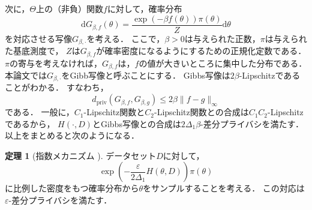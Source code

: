 \documentclass{jarticle}
\newcommand{\dd}{\mathrm{d}}
\theoremstyle{definition}
\newtheorem{thm}{定理}
\begin{document}
次に，$\Theta$上の（非負）関数$f$に対して，確率分布
\begin{equation}
\dd G_{\beta, f}(\theta) =
\frac{\exp(-\beta f(\theta))\pi(\theta)}{Z} \dd \theta
\end{equation}
を対応させる写像$G_{\beta, \cdot}$を考える．
ここで，$\beta > 0$は与えられた正数，$\pi$は与えられた基底測度で，
$Z$は$G_{\beta, f}$が確率密度になるようにするための正規化定数である．
$\pi$の寄与を考えなければ，$G_{\beta, f}$は，$f$の値が大きいところに集中した分布である．
本論文では$G_{\beta, \cdot}$をGibb写像と呼ぶことにする．
Gibbs写像は$2\beta$-Lipschitzであることがわかる．
すなわち，
\begin{equation}
d_\mathrm{priv}(G_{\beta, f}, G_{\beta, g}) \leq 2\beta \parallel f - g \parallel_\infty
\end{equation}
である．
一般に，$C_1$-Lipschitz関数と$C_2$-Lipschitz関数との合成は$C_1 C_2$-Lipschitzであるから，
$H(\cdot, D)$とGibbs写像との合成は$2\Delta_1 \beta$-差分プライバシを満たす．
以上をまとめると次のようになる．
\begin{thm}[指数メカニズム \cite{McSherry2007}]
データセット$D$に対して，
\begin{equation}
\exp \left( - \frac{\varepsilon}{2\Delta_1}H(\theta, D) \right) \pi(\theta)
\end{equation}
に比例した密度をもつ確率分布から$\theta$をサンプルすることを考える．
この対応は$\varepsilon$-差分プライバシを満たす．
\end{thm}
\end{document}

